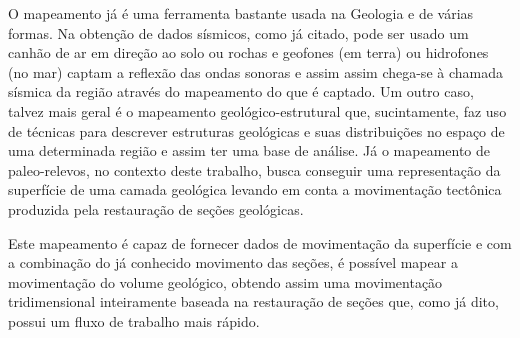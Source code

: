 O mapeamento já é uma ferramenta bastante usada na Geologia e de várias formas. Na obtenção de dados sísmicos, como já citado, pode ser usado um canhão de ar em direção ao solo ou rochas e geofones (em terra) ou hidrofones (no mar) captam a reflexão das ondas sonoras e assim assim chega-se à chamada sísmica da região através do mapeamento do que é captado.\cite{Fossen} Um outro caso, talvez mais geral é o mapeamento geológico-estrutural que, sucintamente, faz uso de técnicas para descrever estruturas geológicas e suas distribuições no espaço de uma determinada região e assim ter uma base de análise.\cite{Borges, Felipe} Já o mapeamento de paleo-relevos, no contexto deste trabalho, busca conseguir uma representação da superfície de uma camada geológica levando em conta a movimentação tectônica produzida pela restauração de seções geológicas.

Este mapeamento é capaz de fornecer dados de movimentação da superfície e com a combinação do já conhecido movimento das seções, é possível mapear a movimentação do volume geológico, obtendo assim uma movimentação tridimensional inteiramente baseada na restauração de seções que, como já dito, possui um fluxo de trabalho mais rápido.

\fi



